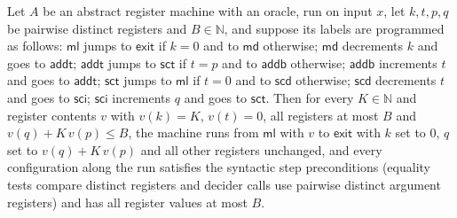 \begin{theorem}
\label{Complexity.LogProg.epad_mul_loop}
\leanok
{}
Let $A$ be an abstract register machine with an oracle, run on input $x$, let $k, t, p, q$ be
pairwise distinct registers and $B \in \mathbb{N}$, and suppose its labels are programmed as
follows: $\mathsf{ml}$ jumps to $\mathsf{exit}$ if $k = 0$ and to $\mathsf{md}$ otherwise;
$\mathsf{md}$ decrements $k$ and goes to $\mathsf{addt}$; $\mathsf{addt}$ jumps to $\mathsf{sct}$ if
$t = p$ and to $\mathsf{addb}$ otherwise; $\mathsf{addb}$ increments $t$ and goes to
$\mathsf{addt}$; $\mathsf{sct}$ jumps to $\mathsf{ml}$ if $t = 0$ and to $\mathsf{scd}$ otherwise;
$\mathsf{scd}$ decrements $t$ and goes to $\mathsf{sci}$; $\mathsf{sci}$ increments $q$ and goes to
$\mathsf{sct}$. Then for every $K \in \mathbb{N}$ and register contents $v$ with $v(k) = K$,
$v(t) = 0$, all registers at most $B$ and $v(q) + K\,v(p) \le B$, the machine runs from
$\mathsf{ml}$ with $v$ to $\mathsf{exit}$ with $k$ set to $0$, $q$ set to $v(q) + K\,v(p)$ and all
other registers unchanged, and every configuration along the run satisfies the syntactic step preconditions (equality tests compare distinct registers and decider calls use pairwise distinct argument registers) and has all register values at most $B$.
\end{theorem}

